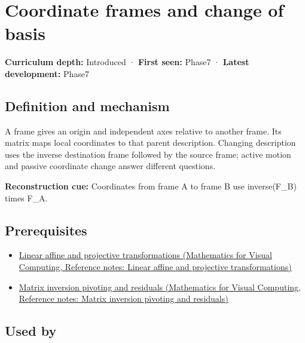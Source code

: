 \hypertarget{appendix-1bae9457dbc3}{}\label{referencestart:appendix-1bae9457dbc3}
\section{Coordinate frames and change of basis}\label{appendix-1bae9457dbc3-coordinate-frames-and-change-of-basis}

\textbf{Curriculum depth:} Introduced · \textbf{First seen:} Phase7 · \textbf{Latest development:} Phase7

\subsection{Definition and mechanism}\label{appendix-1bae9457dbc3-definition-and-mechanism}

A frame gives an origin and independent axes relative to another frame. Its matrix maps local coordinates to that parent description. Changing description uses the inverse destination frame followed by the source frame; active motion and passive coordinate change answer different questions.

\textbf{Reconstruction cue:} Coordinates from frame A to frame B use inverse(F\_B) times F\_A.

\subsection{Prerequisites}\label{appendix-1bae9457dbc3-prerequisites}

\begin{itemize}
\tightlist
\item
  \href{../02-Mathematics-for-Visual-Computing/main.pdf\#nameddest=appendix-0bf0ca73f735}{Linear affine and projective transformations (Mathematics for Visual Computing, Reference notes: Linear affine and projective transformations)}
\item
  \href{../02-Mathematics-for-Visual-Computing/main.pdf\#nameddest=appendix-48d2e66378ab}{Matrix inversion pivoting and residuals (Mathematics for Visual Computing, Reference notes: Matrix inversion pivoting and residuals)}
\end{itemize}

\subsection{Used by}\label{appendix-1bae9457dbc3-used-by}

